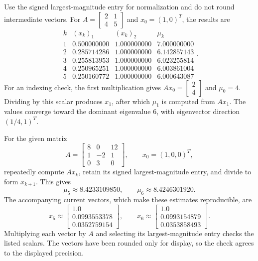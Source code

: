 Use the signed largest-magnitude entry for normalization and do not
round intermediate vectors. For $A=\left[\begin{matrix}2 & 1\\4 & 5\end{matrix}\right]$ and $x_0=(1,0)^T$,
the results are
\[\begin{array}{c|rr|r}k&(x_k)_1&(x_k)_2&\mu_k\\\hline
1&0.500000000&1.000000000&7.000000000\\
2&0.285714286&1.000000000&6.142857143\\
3&0.255813953&1.000000000&6.023255814\\
4&0.250965251&1.000000000&6.003861004\\
5&0.250160772&1.000000000&6.000643087\end{array}.\]
For an indexing check, the first multiplication gives
$Ax_0=\left[\begin{matrix}2\\4\end{matrix}\right]$ and
$\mu_0=4$. Dividing by this scalar produces
$x_1$, after which $\mu_1$ is computed from $Ax_1$.
The values converge toward the dominant eigenvalue $6$,
with eigenvector direction $(1/4,1)^T$.

For the given matrix
\[A=\left[\begin{matrix}8 & 0 & 12\\1 & -2 & 1\\0 & 3 & 0\end{matrix}\right],\qquad x_0=(1,0,0)^T,\]
repeatedly compute $Ax_k$, retain its signed largest-magnitude entry,
and divide to form $x_{k+1}$. This gives
\[\mu_5\approx8.4233109850,\qquad
\mu_6\approx8.4246301920.\]
The accompanying current vectors, which make these estimates reproducible,
are
\[x_5\approx\left[\begin{matrix}1.0\\0.0993553378\\0.0352759154\end{matrix}\right],\qquad
x_6\approx\left[\begin{matrix}1.0\\0.0993154879\\0.0353858493\end{matrix}\right].\]
Multiplying each vector by $A$ and selecting its largest-magnitude
entry checks the listed scalars. The vectors have been rounded only
for display, so the check agrees to the displayed precision.

